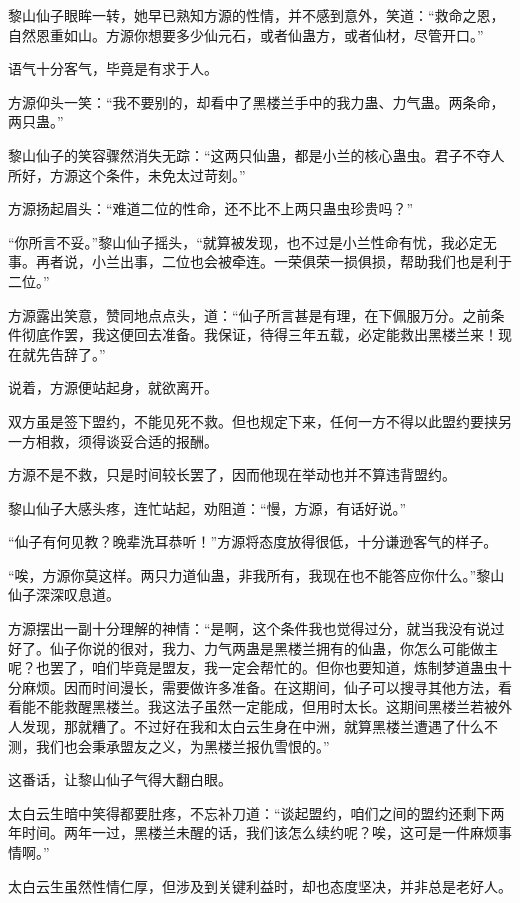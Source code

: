 \begin{this_body}
黎山仙子眼眸一转，她早已熟知方源的性情，并不感到意外，笑道：“救命之恩，自然恩重如山。方源你想要多少仙元石，或者仙蛊方，或者仙材，尽管开口。”

语气十分客气，毕竟是有求于人。

方源仰头一笑：“我不要别的，却看中了黑楼兰手中的我力蛊、力气蛊。两条命，两只蛊。”

黎山仙子的笑容骤然消失无踪：“这两只仙蛊，都是小兰的核心蛊虫。君子不夺人所好，方源这个条件，未免太过苛刻。”

方源扬起眉头：“难道二位的性命，还不比不上两只蛊虫珍贵吗？”

“你所言不妥。”黎山仙子摇头，“就算被发现，也不过是小兰性命有忧，我必定无事。再者说，小兰出事，二位也会被牵连。一荣俱荣一损俱损，帮助我们也是利于二位。”

方源露出笑意，赞同地点点头，道：“仙子所言甚是有理，在下佩服万分。之前条件彻底作罢，我这便回去准备。我保证，待得三年五载，必定能救出黑楼兰来！现在就先告辞了。”

说着，方源便站起身，就欲离开。

双方虽是签下盟约，不能见死不救。但也规定下来，任何一方不得以此盟约要挟另一方相救，须得谈妥合适的报酬。

方源不是不救，只是时间较长罢了，因而他现在举动也并不算违背盟约。

黎山仙子大感头疼，连忙站起，劝阻道：“慢，方源，有话好说。”

“仙子有何见教？晚辈洗耳恭听！”方源将态度放得很低，十分谦逊客气的样子。

“唉，方源你莫这样。两只力道仙蛊，非我所有，我现在也不能答应你什么。”黎山仙子深深叹息道。

方源摆出一副十分理解的神情：“是啊，这个条件我也觉得过分，就当我没有说过好了。仙子你说的很对，我力、力气两蛊是黑楼兰拥有的仙蛊，你怎么可能做主呢？也罢了，咱们毕竟是盟友，我一定会帮忙的。但你也要知道，炼制梦道蛊虫十分麻烦。因而时间漫长，需要做许多准备。在这期间，仙子可以搜寻其他方法，看看能不能救醒黑楼兰。我这法子虽然一定能成，但用时太长。这期间黑楼兰若被外人发现，那就糟了。不过好在我和太白云生身在中洲，就算黑楼兰遭遇了什么不测，我们也会秉承盟友之义，为黑楼兰报仇雪恨的。”

这番话，让黎山仙子气得大翻白眼。

太白云生暗中笑得都要肚疼，不忘补刀道：“谈起盟约，咱们之间的盟约还剩下两年时间。两年一过，黑楼兰未醒的话，我们该怎么续约呢？唉，这可是一件麻烦事情啊。”

太白云生虽然性情仁厚，但涉及到关键利益时，却也态度坚决，并非总是老好人。


\end{this_body}
